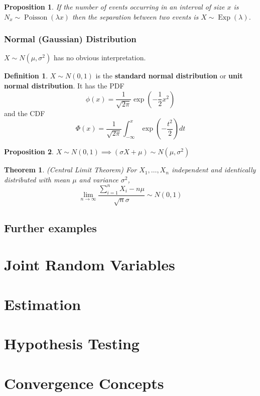 \documentclass[12pt]{article}
\newtheorem{thm}{Theorem}[section]
\newtheorem*{prop*}{Proposition}
\theoremstyle{definition}
\newtheorem*{defn*}{Definition}
\DeclareMathOperator{\Poisson}{Poisson}
\DeclareMathOperator{\Exp}{Exp}
\begin{document}
\begin{prop*}
  If the number of events occurring in an interval of size $x$ is\\ $N_x \sim \Poisson(\lambda x)$ then the separation between two events is $X \sim \Exp(\lambda)$.
\end{prop*}

\subsubsection{Normal (Gaussian) Distribution}

$X \sim N(\mu, \sigma^2)$ has no obvious interpretation.

\begin{defn*}
  $X \sim N(0, 1)$ is the \textbf{standard normal distribution} or \textbf{unit normal distribution}.
  It has the PDF
  $$\phi(x) = \frac{1}{\sqrt{2\pi}}\exp\left(-\frac{1}{2}x^2\right)$$
  and the CDF
  $$\Phi(x) = \frac{1}{\sqrt{2\pi}}\int_{-\infty}^x\exp\left(-\frac{t^2}{2}\right)dt$$
\end{defn*}

\begin{prop*}
  $X \sim N(0, 1) \implies (\sigma X + \mu) \sim N(\mu, \sigma^2)$
\end{prop*}


\begin{thm}
  (Central Limit Theorem)
  For $X_1, \ldots, X_n$ independent and identically distributed with mean $\mu$ and variance $\sigma^2$,
  $$\lim_{n \to \infty}\frac{\sum_{i = 1}^nX_i - n\mu}{\sqrt{n}\sigma} \sim N(0, 1)$$
\end{thm}


\subsection{Further examples}

\section{Joint Random Variables}

\section{Estimation}

\section{Hypothesis Testing}

\section{Convergence Concepts}
\end{document}
